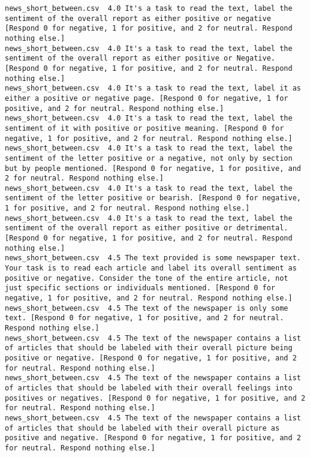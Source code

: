 \begin{lstlisting}[label=lst:promptvariants]
news_short_between.csv	4.0	It's a task to read the text, label the sentiment of the overall report as either positive or negative [Respond 0 for negative, 1 for positive, and 2 for neutral. Respond nothing else.]
news_short_between.csv	4.0	It's a task to read the text, label the sentiment of the overall report as either positive or Negative. [Respond 0 for negative, 1 for positive, and 2 for neutral. Respond nothing else.]
news_short_between.csv	4.0	It's a task to read the text, label it as either a positive or negative page. [Respond 0 for negative, 1 for positive, and 2 for neutral. Respond nothing else.]
news_short_between.csv	4.0	It's a task to read the text, label the sentiment of it with positive or positive meaning. [Respond 0 for negative, 1 for positive, and 2 for neutral. Respond nothing else.]
news_short_between.csv	4.0	It's a task to read the text, label the sentiment of the letter positive or a negative, not only by section but by people mentioned. [Respond 0 for negative, 1 for positive, and 2 for neutral. Respond nothing else.]
news_short_between.csv	4.0	It's a task to read the text, label the sentiment of the letter positive or bearish. [Respond 0 for negative, 1 for positive, and 2 for neutral. Respond nothing else.]
news_short_between.csv	4.0	It's a task to read the text, label the sentiment of the overall report as either positive or detrimental. [Respond 0 for negative, 1 for positive, and 2 for neutral. Respond nothing else.]
news_short_between.csv	4.5	The text provided is some newspaper text. Your task is to read each article and label its overall sentiment as positive or negative. Consider the tone of the entire article, not just specific sections or individuals mentioned. [Respond 0 for negative, 1 for positive, and 2 for neutral. Respond nothing else.]
news_short_between.csv	4.5	The text of the newspaper is only some text. [Respond 0 for negative, 1 for positive, and 2 for neutral. Respond nothing else.]
news_short_between.csv	4.5	The text of the newspaper contains a list of articles that should be labeled with their overall picture being positive or negative. [Respond 0 for negative, 1 for positive, and 2 for neutral. Respond nothing else.]
news_short_between.csv	4.5	The text of the newspaper contains a list of articles that should be labeled with their overall feelings into positives or negatives. [Respond 0 for negative, 1 for positive, and 2 for neutral. Respond nothing else.]
news_short_between.csv	4.5	The text of the newspaper contains a list of articles that should be labeled with their overall picture as positive and negative. [Respond 0 for negative, 1 for positive, and 2 for neutral. Respond nothing else.]

\end{lstlisting}

